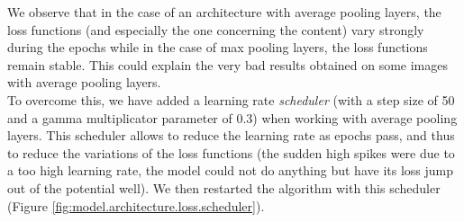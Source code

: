 \documentclass[twocolumn,superscriptaddress,aps,floatfix,nofootinbib]{revtex4-1}
\begin{document}
    We observe that in the case of an architecture with average pooling layers, the loss functions (and especially the one concerning the content) vary strongly during the epochs while in the case of max pooling layers, the loss functions remain stable. This could explain the very bad results obtained on some images with average pooling layers.\\
    
    To overcome this, we have added a learning rate \emph{scheduler} (with a step size of 50 and a gamma multiplicator parameter of 0.3) when working with average pooling layers. This scheduler allows to reduce the learning rate as epochs pass, and thus to reduce the variations of the loss functions (the sudden high spikes were due to a too high learning rate, the model could not do anything but have its loss jump out of the potential well). We then restarted the algorithm with this scheduler (Figure \ref{fig:model.architecture.loss.scheduler}).
    
\end{document}
